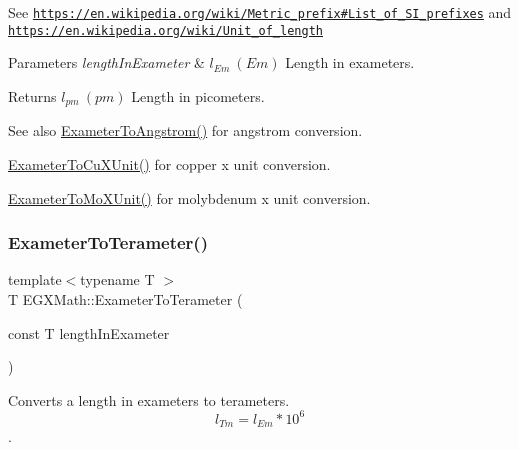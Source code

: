 See \href{https://en.wikipedia.org/wiki/Metric_prefix#List_of_SI_prefixes}{\tt https\+://en.\+wikipedia.\+org/wiki/\+Metric\+\_\+prefix\#\+List\+\_\+of\+\_\+\+S\+I\+\_\+prefixes} and \href{https://en.wikipedia.org/wiki/Unit_of_length}{\tt https\+://en.\+wikipedia.\+org/wiki/\+Unit\+\_\+of\+\_\+length} 
\begin{DoxyParams}{Parameters}
{\em length\+In\+Exameter} & $ l_{Em}\ (Em)$ Length in exameters. \\
\hline
\end{DoxyParams}
\begin{DoxyReturn}{Returns}
$ l_{pm}\ (pm)$ Length in picometers. 
\end{DoxyReturn}
\begin{DoxySeeAlso}{See also}
\mbox{\hyperlink{group___e_g_x_math-_conversions-_length_conversions-_s_i-_exameter-_non-_s_i_ga24d2ee057470ce37f99d31451e010a22}{Exameter\+To\+Angstrom()}} for angstrom conversion. 

\mbox{\hyperlink{group___e_g_x_math-_conversions-_length_conversions-_s_i-_exameter-_non-_s_i_gacb2c9fea6b2c2d12ee485f378f5a6af0}{Exameter\+To\+Cu\+X\+Unit()}} for copper x unit conversion. 

\mbox{\hyperlink{group___e_g_x_math-_conversions-_length_conversions-_s_i-_exameter-_non-_s_i_gadf73e46609660df6b7ae77ec7241183e}{Exameter\+To\+Mo\+X\+Unit()}} for molybdenum x unit conversion. 
\end{DoxySeeAlso}
\mbox{\label{group___e_g_x_math-_conversions-_length_conversions-_s_i-_exameter-_s_i_gaf16e87fbeccc6175baa72ed6bb9db027}} 
\subsubsection{\texorpdfstring{Exameter\+To\+Terameter()}{ExameterToTerameter()}}
{\footnotesize\ttfamily template$<$typename T $>$ \\
T E\+G\+X\+Math\+::\+Exameter\+To\+Terameter (\begin{DoxyParamCaption}\item[{const T}]{length\+In\+Exameter }\end{DoxyParamCaption})}



Converts a length in exameters to terameters. \[ l_{Tm}=l_{Em} * 10^{6} \]. 

